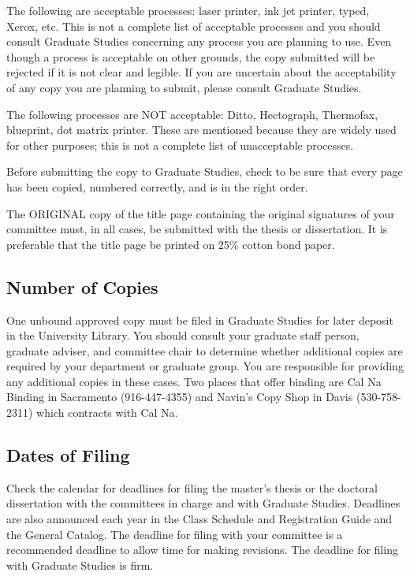 The following are acceptable processes: laser printer, ink jet printer, typed, Xerox, etc. This is not a complete list of acceptable processes and you should consult Graduate Studies concerning any process you are planning to use. Even though a process is acceptable on other grounds, the copy submitted will be rejected if it is not clear and legible. If you are uncertain about the acceptability of any copy you are planning to submit, please consult Graduate Studies.

The following processes are NOT acceptable: Ditto, Hectograph, Thermofax, blueprint, dot matrix printer. These are mentioned because they are widely used for other purposes; this is not a complete list of unacceptable processes.

Before submitting the copy to Graduate Studies, check to be sure that every page has been copied, numbered correctly, and is in the right order.

The ORIGINAL copy of the title page containing the original signatures of your committee must, in all cases, be submitted with the thesis or dissertation. It is preferable that the title page be printed on 25\% cotton bond paper.

\subsection{Number of Copies}
%
One unbound approved copy must be filed in Graduate Studies for later deposit in the University Library. You should consult your graduate staff person, graduate adviser, and committee chair to determine whether additional copies are required by your department or graduate group. You are responsible for providing any additional copies in these cases. Two places that offer binding are Cal Na Binding in Sacramento (916-447-4355) and Navin's Copy Shop in Davis (530-758-2311) which contracts with Cal Na.

\subsection{Dates of Filing}
%
Check the calendar for deadlines for filing the master's thesis or the doctoral dissertation with the committees in charge and with Graduate Studies. Deadlines are also announced each year in the Class Schedule and Registration Guide and the General Catalog. The deadline for filing with your committee is a recommended deadline to allow time for making revisions. The deadline for filing with Graduate Studies is firm.

